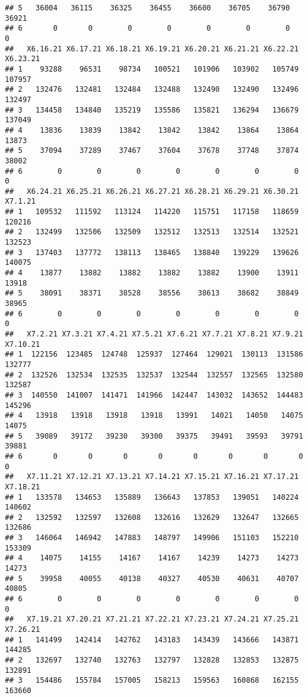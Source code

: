 \documentclass[
]{article}
\begin{document}
\begin{verbatim}
## 5   36004   36115    36325    36455    36600    36705    36790    36921
## 6       0       0        0        0        0        0        0        0
##   X6.16.21 X6.17.21 X6.18.21 X6.19.21 X6.20.21 X6.21.21 X6.22.21 X6.23.21
## 1    93288    96531    98734   100521   101906   103902   105749   107957
## 2   132476   132481   132484   132488   132490   132490   132496   132497
## 3   134458   134840   135219   135586   135821   136294   136679   137049
## 4    13836    13839    13842    13842    13842    13864    13864    13873
## 5    37094    37289    37467    37604    37678    37748    37874    38002
## 6        0        0        0        0        0        0        0        0
##   X6.24.21 X6.25.21 X6.26.21 X6.27.21 X6.28.21 X6.29.21 X6.30.21 X7.1.21
## 1   109532   111592   113124   114220   115751   117158   118659  120216
## 2   132499   132506   132509   132512   132513   132514   132521  132523
## 3   137403   137772   138113   138465   138840   139229   139626  140075
## 4    13877    13882    13882    13882    13882    13900    13911   13918
## 5    38091    38371    38528    38556    38613    38682    38849   38965
## 6        0        0        0        0        0        0        0       0
##   X7.2.21 X7.3.21 X7.4.21 X7.5.21 X7.6.21 X7.7.21 X7.8.21 X7.9.21 X7.10.21
## 1  122156  123485  124748  125937  127464  129021  130113  131586   132777
## 2  132526  132534  132535  132537  132544  132557  132565  132580   132587
## 3  140550  141007  141471  141966  142447  143032  143652  144483   145296
## 4   13918   13918   13918   13918   13991   14021   14050   14075    14075
## 5   39089   39172   39230   39300   39375   39491   39593   39791    39881
## 6       0       0       0       0       0       0       0       0        0
##   X7.11.21 X7.12.21 X7.13.21 X7.14.21 X7.15.21 X7.16.21 X7.17.21 X7.18.21
## 1   133578   134653   135889   136643   137853   139051   140224   140602
## 2   132592   132597   132608   132616   132629   132647   132665   132686
## 3   146064   146942   147883   148797   149906   151103   152210   153309
## 4    14075    14155    14167    14167    14239    14273    14273    14273
## 5    39958    40055    40138    40327    40530    40631    40707    40805
## 6        0        0        0        0        0        0        0        0
##   X7.19.21 X7.20.21 X7.21.21 X7.22.21 X7.23.21 X7.24.21 X7.25.21 X7.26.21
## 1   141499   142414   142762   143183   143439   143666   143871   144285
## 2   132697   132740   132763   132797   132828   132853   132875   132891
## 3   154486   155784   157005   158213   159563   160868   162155   163660

\end{verbatim}
\end{document}

